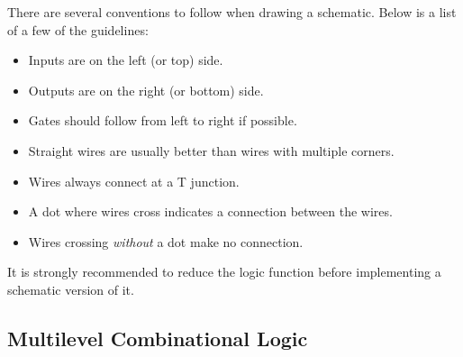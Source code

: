 \documentclass[12pt]{article}
\begin{document}
There are several conventions to follow when drawing a schematic. Below is a list of a few of the guidelines:

\begin{itemize}
    \item Inputs are on the left (or top) side.
    \item Outputs are on the right (or bottom) side.
    \item Gates should follow from left to right if possible.
    \item Straight wires are usually better than wires with multiple corners.
    \item Wires always connect at a T junction.
    \item A dot where wires cross indicates a connection between the wires.
    \item Wires crossing \textit{without} a dot make no connection.
\end{itemize}

It is strongly recommended to reduce the logic function before implementing a schematic version of it.

\subsection{Multilevel Combinational Logic}
\end{document}
